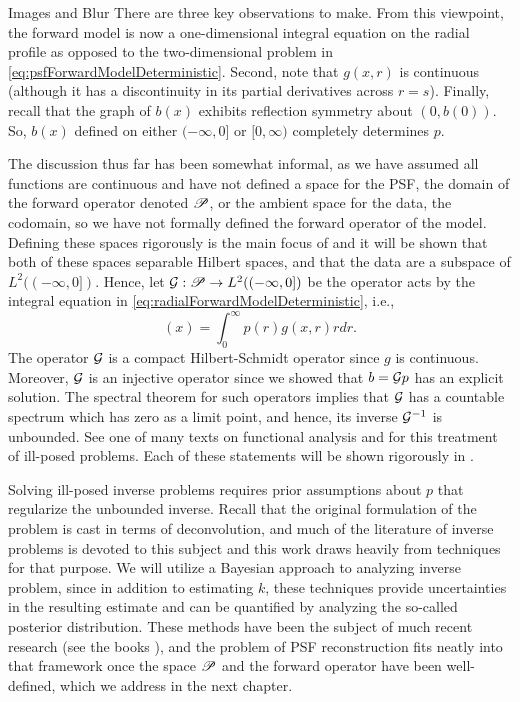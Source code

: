 \begin{chapter}{Images and Blur}
  There are three key observations to make.
  From this viewpoint, the forward model is now a one-dimensional integral equation on the radial profile as opposed to the two-dimensional problem in \eqref{eq:psfForwardModelDeterministic}.
  Second, note that $g(x,r)$ is continuous (although it has a discontinuity in its partial derivatives across $r=s$).
  Finally, recall that the graph of $b(x)$ exhibits reflection symmetry about $(0,b(0))$.
  So, $b(x)$ defined on either $(-\infty,0]$ or $[0,\infty)$ completely determines $p$.

  The discussion thus far has been somewhat informal, as we have assumed all functions are continuous and have not defined a space for the PSF, the domain of the forward operator denoted $\mathscr P$, or the ambient space for the data, the codomain, so we have not formally defined the forward operator of the model.
  Defining these spaces rigorously is the main focus of  and it will be shown that both of these spaces separable Hilbert spaces, and that the data are a subspace of $L^2((-\infty,0])$.
   Hence, let $\mathcal G: \mathscr P \to L^2((-\infty,0])$ be the operator acts by the integral equation in \eqref{eq:radialForwardModelDeterministic}, i.e., 
  \begin{equation}
    [\G p](x) = \int_0^\infty p(r) g(x,r) r dr.
  \end{equation}
  The operator $\mathcal G$ is a compact Hilbert-Schmidt operator since $g$ is continuous.
  Moreover, $\mathcal G$ is an injective operator since we showed that $b = \mathcal G p$ has an explicit solution. 
  The spectral theorem for such operators implies that $\mathcal G$ has a countable spectrum which has zero as a limit point, and hence, its inverse $\mathcal G^{-1}$ is unbounded. %
  See one of many texts on functional analysis \citep{bachman1966,rudin1991} and \citep{tikhonov1963,vogel2002,morozov1993} for this treatment of ill-posed problems.
  Each of these statements will be shown rigorously in .

  Solving ill-posed inverse problems requires prior assumptions about $p$ that regularize the unbounded inverse.
  Recall that the original formulation of the problem is cast in terms of deconvolution, and much of the literature of inverse problems is devoted to this subject and this work draws heavily from techniques for that purpose. 
  We will utilize a Bayesian approach to analyzing inverse problem, since in addition to estimating $k$, these techniques provide uncertainties in the resulting estimate and can be quantified by analyzing the so-called posterior distribution.
  These methods have been the subject of much recent research (see the books \citep{calvetti2007introduction,kaipo2005,stuart2010}), and the problem of PSF reconstruction fits neatly into that framework once the space $\mathscr P$ and the forward operator have been well-defined, which we address in the next chapter.

\end{chapter}
